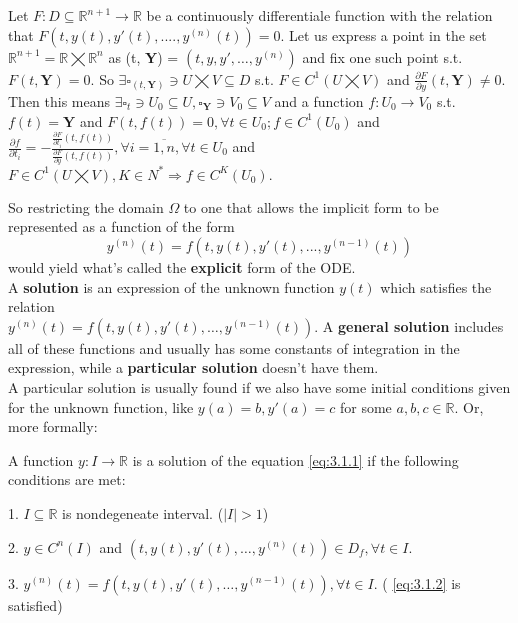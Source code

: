\begin{theorem}
    Let $F:D \subseteq \mathbb{R}^{n+1}\rightarrow\mathbb{R}$ be a continuously differentiale function with the relation that $F(t,y(t),y'(t),....,y^{(n)}(t))=0$. Let us express a point in the set $\mathbb{R}^{n+1} =\mathbb{R}\bigtimes\mathbb{R}^n$ as (t, \textbf{Y}) = $(t, y,y', \dots, y^{ (n) })$ and fix one such point s.t. $F(t, \textbf{Y})=0$.
    So $\exists \square_{(t, \textbf{Y})} \ni U \bigtimes V \subseteq D$ s.t. $F \in C^1(U\bigtimes V)$ and $\frac{\partial F}{\partial y}(t, \textbf{Y}) \neq 0.$ Then this means $ \exists \square_{t} \ni U_0 \subseteq U,
        \square_{\textbf{Y}} \ni V_0 \subseteq V$ and a function $f : U_0 \rightarrow V_0$ s.t. $f(t) = \textbf{Y}$ and $F(t,f(t))=0, \forall t \in U_0; f \in C^1(U_0)$ and $\frac{\partial f}{\partial t_i} = - \frac{\frac{\partial F}{\partial t_i}(t,f(t))}{\frac{\partial F}{\partial y}(t,f(t))}, \forall i = \overline{1,n} , \forall t \in U_0$ and $F \in C^1(U \bigtimes V),K \in N^* \Rightarrow f \in C^K(U_0).$
\end{theorem}

So restricting the domain $\Omega$ to one that allows the implicit form to be represented as a function of the form
\begin{equation}\label{eq:3.1.2}
    y^{(n)}(t)=f(t,y(t),y'(t),...,y^{(n-1)}(t))
\end{equation}
would yield what's called the \textbf{explicit} form of the ODE. \\

A \textbf{solution} is an expression of the unknown function $y(t)$ which satisfies the relation \\
$y^{(n)}(t) = f(t,y(t),y'(t),\dots,y^{(n-1)}(t))$. A \textbf{general solution} includes all of these functions and usually has some constants of integration in the expression, while a \textbf{particular solution} doesn't have them. \\
A particular solution is usually found if we also have some initial conditions given for the unknown function, like $y(a)=b, y'(a)=c$ for some $a,b,c  \in \mathbb{R}$.
Or, more formally:

\begin{definition}
    A function $y:I \rightarrow \mathbb{R}$ is a solution of the equation \ref{eq:3.1.1} if the following conditions are met:

    1. $I \subseteq \mathbb{R}$ is nondegeneate interval. ($|I|>1$)

    2. $y \in C^n(I)$ and $(t,y(t), y'(t), \dots, y^{(n)}(t)) \in D_f, \forall t \in I$.

    3. $y^{(n)}(t)= f(t,y(t),y'(t),\dots,y^{ (n-1) }(t)), \forall t \in I$. ( \ref{eq:3.1.2} is satisfied)

\end{definition}

